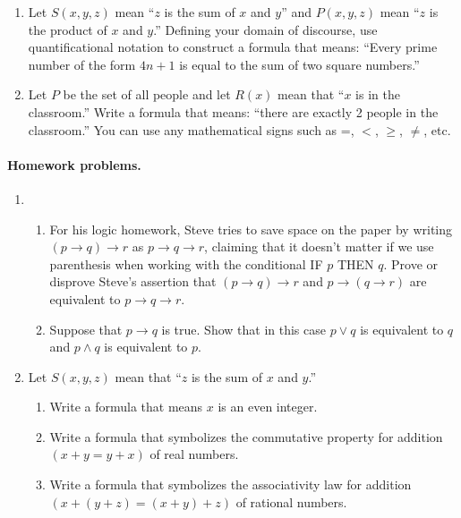 \documentclass[12pt]{article}
\begin{document}
\begin{enumerate}
\begin{enumerate}
\item Let $S(x, y, z)$ mean ``$z$ is the sum of $x$ and $y$'' and $P(x, y, z)$ mean ``$z$ is the product of $x$ and $y$.'' Defining your domain of discourse, use quantificational notation to construct a formula that means: ``Every prime number of the form $4n + 1$ is equal to the sum of two square numbers.''

\item Let $P$ be the set of all people and let $R(x)$ mean that ``$x$ is in the classroom.'' Write a formula that means: ``there are exactly 2 people in the classroom.'' You can use any mathematical signs such as =, $<$, $\geq$, $\neq$, etc.


\end{enumerate}

\end{enumerate}



\pagebreak

\paragraph*{Homework problems.}


\begin{enumerate}


\item 
\begin{enumerate}
	\item For his logic homework, Steve tries to save space on the paper by writing $(p \rightarrow q) \rightarrow r$ as $p \rightarrow q \rightarrow r$, claiming that it doesn't matter if we use parenthesis when working with the conditional IF $p$ THEN $q$. Prove or disprove Steve's assertion that $(p \rightarrow q) \rightarrow r$ and $p \rightarrow (q \rightarrow r)$ are equivalent to $p \rightarrow q \rightarrow r$.
	
	\item Suppose that $p \rightarrow q$ is true. Show that in this case $p \vee q$ is equivalent to $q$ and $p \wedge q$ is equivalent to $p$.
\end{enumerate}

\item Let $S(x, y, z)$ mean that ``$z$ is the sum of $x$ and $y$.''
\begin{enumerate}
	\item Write a formula that means $x$ is an even integer.
	
	\item Write a formula that symbolizes the commutative property for addition $(x+y = y +x)$ of real numbers.
	
	\item Write a formula that symbolizes the associativity law for addition\\ $(x + (y + z) = (x + y) + z)$ of rational numbers.
\end{enumerate}


\end{enumerate}



\pagebreak
\end{document}
